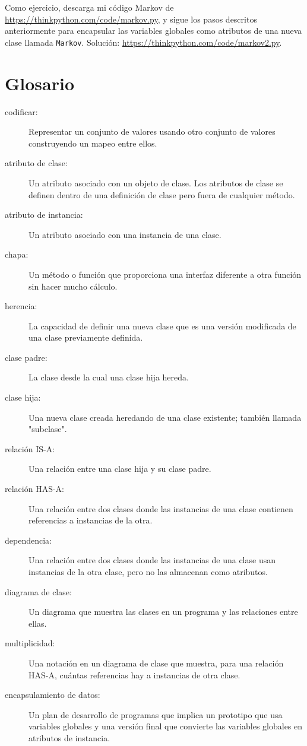 Como ejercicio, descarga mi código Markov de \url{https://thinkpython.com/code/markov.py}, y sigue los pasos descritos anteriormente para encapsular las variables globales como atributos de una nueva clase llamada \texttt{Markov}. Solución: \url{https://thinkpython.com/code/markov2.py}.

\section{Glosario}

\begin{description}
    \item[codificar:] Representar un conjunto de valores usando otro conjunto de valores construyendo un mapeo entre ellos.
    \item[atributo de clase:] Un atributo asociado con un objeto de clase. Los atributos de clase se definen dentro de una definición de clase pero fuera de cualquier método.
    \item[atributo de instancia:] Un atributo asociado con una instancia de una clase.
    \item[chapa:] Un método o función que proporciona una interfaz diferente a otra función sin hacer mucho cálculo.
    \item[herencia:] La capacidad de definir una nueva clase que es una versión modificada de una clase previamente definida.
    \item[clase padre:] La clase desde la cual una clase hija hereda.
    \item[clase hija:] Una nueva clase creada heredando de una clase existente; también llamada "subclase".
    \item[relación IS-A:] Una relación entre una clase hija y su clase padre.
    \item[relación HAS-A:] Una relación entre dos clases donde las instancias de una clase contienen referencias a instancias de la otra.
    \item[dependencia:] Una relación entre dos clases donde las instancias de una clase usan instancias de la otra clase, pero no las almacenan como atributos.
    \item[diagrama de clase:] Un diagrama que muestra las clases en un programa y las relaciones entre ellas.
    \item[multiplicidad:] Una notación en un diagrama de clase que muestra, para una relación HAS-A, cuántas referencias hay a instancias de otra clase.
    \item[encapsulamiento de datos:] Un plan de desarrollo de programas que implica un prototipo que usa variables globales y una versión final que convierte las variables globales en atributos de instancia.
\end{description}

